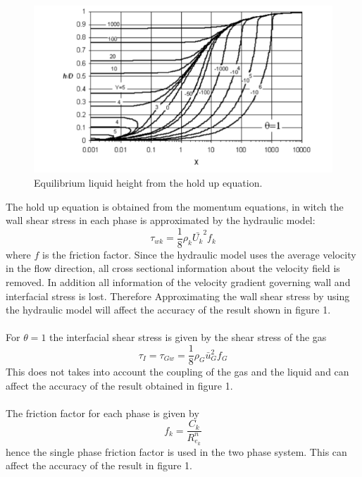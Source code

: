 \documentclass[10pt,a4paper]{report}
\begin{document}
\begin{figure}[H]
  \caption{Equilibrium liquid height from the hold up equation.}
  \centering
    \includegraphics[width=1\textwidth]{hup.png}
\end{figure}
The hold up equation is obtained from the momentum equations, in witch the wall shear stress in each phase is approximated by the hydraulic model:
\begin{equation}
\tau_{wk} = \frac{1}{8}\rho_{k} \bar{U_{k}}^{2}f_{k} \nonumber
\end{equation}
where $f$ is the friction factor. Since the hydraulic model uses the average velocity in the flow direction, all cross sectional information about the velocity field is removed. In addition all information of the velocity gradient governing wall and interfacial stress is lost. Therefore Approximating the wall shear stress by using the hydraulic model will affect the accuracy of the result shown in figure 1.\\
\\
For $\theta = 1$ the interfacial shear stress is given by the shear stress of the gas
\begin{equation}
\tau_{I} = \tau_{Gw}=\frac{1}{8}\rho_{G} \bar{u}_{G}^{2}f_{G}\nonumber
\end{equation}
This does not takes into account the coupling of the gas and the liquid and can affect the accuracy of the result obtained in figure 1.\\
\\
The friction factor for each phase is given by
\begin{equation}
f_{k} = \frac{C_{k}}{R^{n}_{e_{k}}} \nonumber
\end{equation}
hence the single phase friction factor is used in the two phase system. This can affect the accuracy of the result in figure 1.
\end{document}
